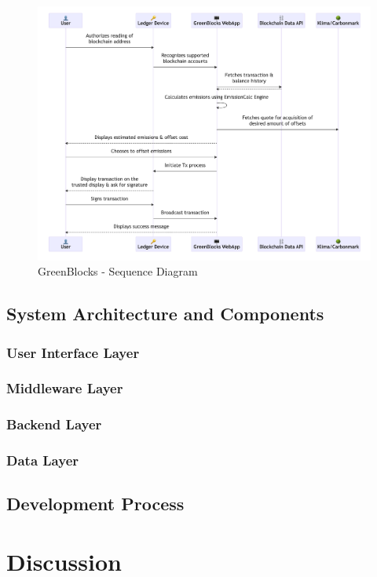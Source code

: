 \documentclass[11pt]{report}
\begin{document}
\begin{figure}[hbt!]
    \centering
    \centerline{\includegraphics[scale=.27]{figures/sequence.png}}
    \caption{GreenBlocks - Sequence Diagram}
    \label{fig:sequence}
\end{figure}



\section{System Architecture and Components}
\subsection{User Interface Layer}
\subsection{Middleware Layer}
\subsection{Backend Layer}
\subsection{Data Layer}
\section{Development Process}

\chapter{Discussion}
\end{document}
